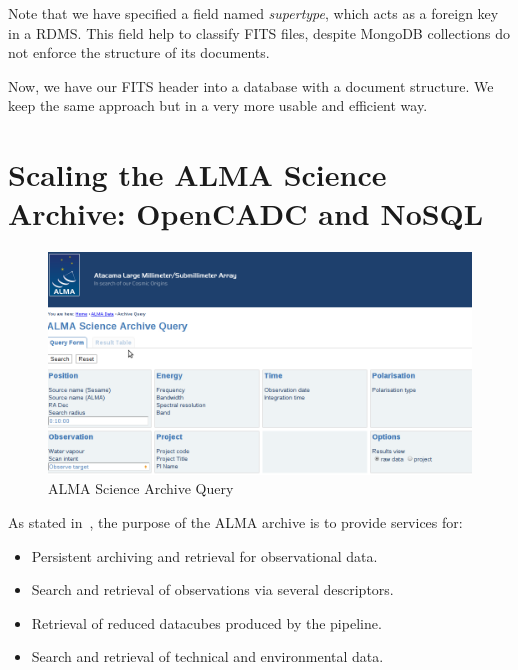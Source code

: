 Note that we have specified a field named \emph{supertype}, which acts as a foreign key in a RDMS. This field help to classify FITS files, despite MongoDB collections do not enforce the structure of its documents.

Now, we have our FITS header into a database with a document structure. We keep the same approach but in a very more usable and efficient way.




\section{Scaling the ALMA Science Archive: OpenCADC and NoSQL} %
\label{sec:rewriting_the_alma_science_archive_with_nosql}

\begin{figure}
\centering
\includegraphics[width=\textwidth]{images/aq.png}
\caption{ALMA Science Archive Query}
\end{figure}

 
As stated in~\cite{2009ASPC..404..324E}, the purpose of the ALMA archive is to provide services for:

\begin{itemize}

\item Persistent archiving and retrieval for observational data.

\item Search and retrieval of observations via several descriptors. %

\item Retrieval of reduced datacubes
produced by
the
pipeline.

\item Search and retrieval of technical and environmental data. %
\end{itemize}

